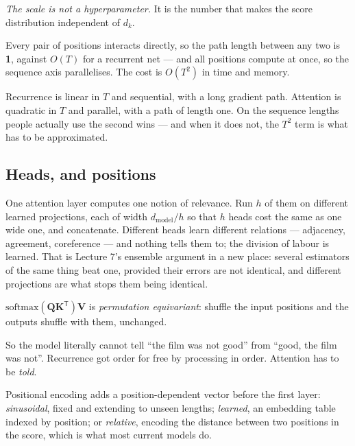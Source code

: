 \documentclass[11pt,a4paper]{article}
\begin{document}
\emph{The scale is not a hyperparameter.} It is the number that makes the score
distribution independent of $d_k$.

\begin{keybox}[title={The trade, stated plainly}]
Every pair of positions interacts directly, so the path length between any two
is \textbf{1}, against $O(T)$ for a recurrent net --- and all positions compute
at once, so the sequence axis parallelises. The cost is $O(T^2)$ in time and
memory.

Recurrence is linear in $T$ and sequential, with a long gradient path.
Attention is quadratic in $T$ and parallel, with a path of length one. On the
sequence lengths people actually use the second wins --- and when it does not,
the $T^2$ term is what has to be approximated.
\end{keybox}

\subsection{Heads, and positions}

One attention layer computes one notion of relevance. Run $h$ of them on
different learned projections, each of width $d_{\text{model}}/h$ so that $h$
heads cost the same as one wide one, and concatenate. Different heads learn
different relations --- adjacency, agreement, coreference --- and nothing tells
them to; the division of labour is learned. That is Lecture 7's ensemble
argument in a new place: several estimators of the same thing beat one,
provided their errors are not identical, and different projections are what
stops them being identical.

\begin{failbox}[title={Failure condition --- the problem attention creates}]
$\mathrm{softmax}(\mathbf{Q}\mathbf{K}^{\mathsf T})\mathbf{V}$ is
\emph{permutation equivariant}: shuffle the input positions and the outputs
shuffle with them, unchanged.

So the model literally cannot tell ``the film was not good'' from ``good, the
film was not''. Recurrence got order for free by processing in order.
Attention has to be \emph{told}.
\end{failbox}

Positional encoding adds a position-dependent vector before the first layer:
\emph{sinusoidal}, fixed and extending to unseen lengths; \emph{learned}, an
embedding table indexed by position; or \emph{relative}, encoding the distance
between two positions in the score, which is what most current models do.
\end{document}
